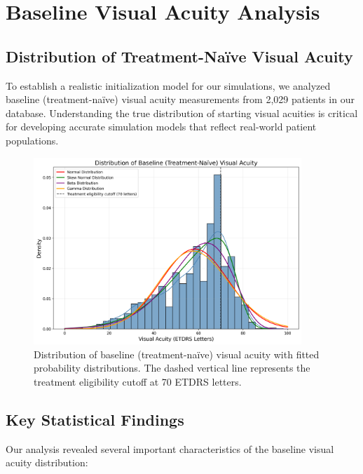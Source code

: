 \section{Baseline Visual Acuity Analysis}

\subsection{Distribution of Treatment-Naïve Visual Acuity}

To establish a realistic initialization model for our simulations, we analyzed baseline (treatment-naïve) visual acuity measurements from 2,029 patients in our database. Understanding the true distribution of starting visual acuities is critical for developing accurate simulation models that reflect real-world patient populations.

\begin{figure}[h]
    \centering
    \includegraphics[width=0.9\textwidth]{figures/acuity/baseline_va_distribution.png}
    \caption{Distribution of baseline (treatment-naïve) visual acuity with fitted probability distributions. The dashed vertical line represents the treatment eligibility cutoff at 70 ETDRS letters.}
    \label{fig:baseline_va_distribution}
\end{figure}

\subsection{Key Statistical Findings}

Our analysis revealed several important characteristics of the baseline visual acuity distribution:

